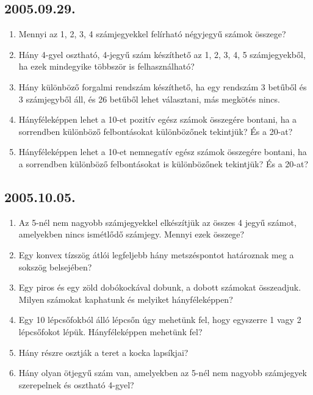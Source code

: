 \subsection*{2005.09.29.}
\begin{enumerate}
\item Mennyi az 1, 2, 3, 4 számjegyekkel felírható négyjegyű számok összege?

\item Hány 4-gyel osztható, 4-jegyű szám készíthető az 1, 2, 3, 4, 5 számjegyekből, ha ezek mindegyike többször is felhasználható?

\item Hány különböző forgalmi rendszám készíthető, ha egy rendszám 3 betűből és 3 számjegyből áll, és 26 betűből lehet választani, más megkötés nincs.

\item Hányféleképpen lehet a 10-et pozitív egész számok összegére bontani, ha a sorrendben különböző felbontásokat különbözőnek tekintjük? És a 20-at?

\item Hányféleképpen lehet a 10-et nemnegatív egész számok összegére bontani, ha a sorrendben különböző felbontásokat is különbözőnek tekintjük? És a 20-at?
\end{enumerate}


\subsection*{2005.10.05.}
\begin{enumerate}
\item Az 5-nél nem nagyobb számjegyekkel elkészítjük az összes 4 jegyű számot, amelyekben nincs ismétlődő számjegy. Mennyi ezek összege?

\item Egy konvex tízszög átlói legfeljebb hány metszéspontot határoznak meg a sokszög belsejében?

\item Egy piros és egy zöld dobókockával dobunk, a dobott számokat összeadjuk. Milyen számokat kaphatunk és melyiket hányféleképpen?

\item Egy 10 lépcsőfokból álló lépcsőn úgy mehetünk fel, hogy egyszerre 1 vagy 2 lépcsőfokot lépük. Hányféleképpen mehetünk fel?

\item Hány részre osztják a teret a kocka lapsíkjai?

\item Hány olyan ötjegyű szám van, amelyekben az 5-nél nem nagyobb számjegyek szerepelnek és osztható 4-gyel?
\end{enumerate}


